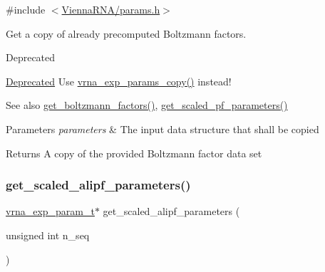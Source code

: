 {\ttfamily \#include $<$\hyperlink{params_8h}{Vienna\+R\+N\+A/params.\+h}$>$}



Get a copy of already precomputed Boltzmann factors. 

\begin{DoxyRefDesc}{Deprecated}
\item[\hyperlink{deprecated__deprecated000094}{Deprecated}]Use \hyperlink{group__energy__parameters_ga70bc46be7cfa5434a71efe241c4f0609}{vrna\+\_\+exp\+\_\+params\+\_\+copy()} instead!\end{DoxyRefDesc}


\begin{DoxySeeAlso}{See also}
\hyperlink{group__energy__parameters_gaef2b931c7e9d4ffb0a5c33df50ec2068}{get\+\_\+boltzmann\+\_\+factors()}, \hyperlink{group__energy__parameters_gabf3b9271c41dd3fac02d56e0b02b3344}{get\+\_\+scaled\+\_\+pf\+\_\+parameters()}
\end{DoxySeeAlso}

\begin{DoxyParams}{Parameters}
{\em parameters} & The input data structure that shall be copied \\
\hline
\end{DoxyParams}
\begin{DoxyReturn}{Returns}
A copy of the provided Boltzmann factor data set 
\end{DoxyReturn}
\mbox{\label{group__energy__parameters_ga0ccf4e1be085a573533fd6b9da2d8cf9}} 
\subsubsection{\texorpdfstring{get\+\_\+scaled\+\_\+alipf\+\_\+parameters()}{get\_scaled\_alipf\_parameters()}}
{\footnotesize\ttfamily \hyperlink{group__energy__parameters_ga01d8b92fe734df8d79a6169482c7d8d8}{vrna\+\_\+exp\+\_\+param\+\_\+t}$\ast$ get\+\_\+scaled\+\_\+alipf\+\_\+parameters (\begin{DoxyParamCaption}\item[{unsigned int}]{n\+\_\+seq }\end{DoxyParamCaption})}



